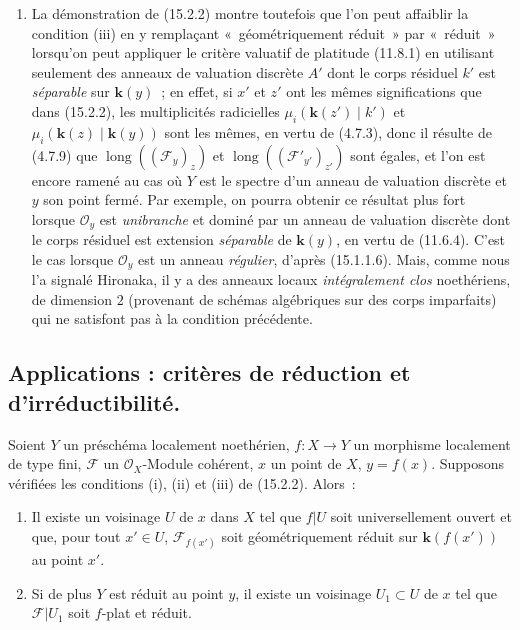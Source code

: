 \begin{remarks}[15.2.4]
\begin{enumerate}[label=(\roman*)]
  \item La démonstration de (15.2.2) montre toutefois que l'on peut affaiblir la
  condition (iii) en y remplaçant «~géométriquement réduit~» par «~réduit~»
  lorsqu'on peut appliquer le critère valuatif de platitude (11.8.1) en utilisant
  seulement des anneaux de valuation discrète $A'$ dont le corps résiduel $k'$
  est \emph{séparable} sur $\boldsymbol{k}(y)$~; en effet, si $x'$ et $z'$ ont les mêmes
  significations que dans (15.2.2), les multiplicités radicielles
  $\mu_i(\boldsymbol{k}(z')\mid k')$ et
  $\mu_i(\boldsymbol{k}(z)\mid\boldsymbol{k}(y))$ sont les mêmes, en vertu de (4.7.3),
  donc il résulte de (4.7.9) que $\operatorname{long}((\mathcal F_y)_z)$ et
  $\operatorname{long}((\mathcal F'_{y'})_{z'})$ sont égales, et l'on est encore
  ramené au cas où $Y$ est le spectre d'un anneau de valuation discrète et $y$
  son point fermé. Par exemple, on pourra obtenir ce résultat plus fort lorsque
  $\mathcal O_y$ est \emph{unibranche} et dominé par un anneau de valuation discrète
  dont le corps résiduel est extension \emph{séparable} de $\boldsymbol{k}(y)$, en vertu de
  (11.6.4). C'est le cas lorsque $\mathcal O_y$ est un anneau \emph{régulier}, d'après
  (15.1.1.6). Mais, comme nous l'a signalé Hironaka, il y a des anneaux locaux
  \emph{intégralement clos} noethériens, de dimension $2$ (provenant de schémas
  algébriques sur des corps imparfaits) qui ne satisfont pas à la condition
  précédente.
\end{enumerate}
\end{remarks}

\subsection{Applications : critères de réduction et d'irréductibilité.}
\label{subsection:IV.15.3-fr}

\begin{proposition}[15.3.1]
\label{IV.15.3.1-fr}
Soient $Y$ un préschéma localement noethérien, $f:X\to Y$ un morphisme localement
de type fini, $\mathcal F$ un $\mathcal O_X$-Module cohérent, $x$ un point de
$X$, $y=f(x)$. Supposons vérifiées les conditions \textup{(i), (ii)} et \textup{(iii)} de
\textup{(15.2.2)}. Alors~:
\begin{enumerate}[label=\textup{(\roman*)}]
  \item Il existe un voisinage $U$ de $x$ dans $X$ tel que $f|U$ soit
  universellement ouvert et que, pour tout $x'\in U$,
  $\mathcal F_{f(x')}$ soit géométriquement réduit sur
  $\boldsymbol{k}(f(x'))$ au point $x'$.
  \item Si de plus $Y$ est réduit au point $y$, il existe un voisinage
  $U_1\subset U$ de $x$ tel que $\mathcal F|U_1$ soit $f$-plat et réduit.
\end{enumerate}
\end{proposition}

